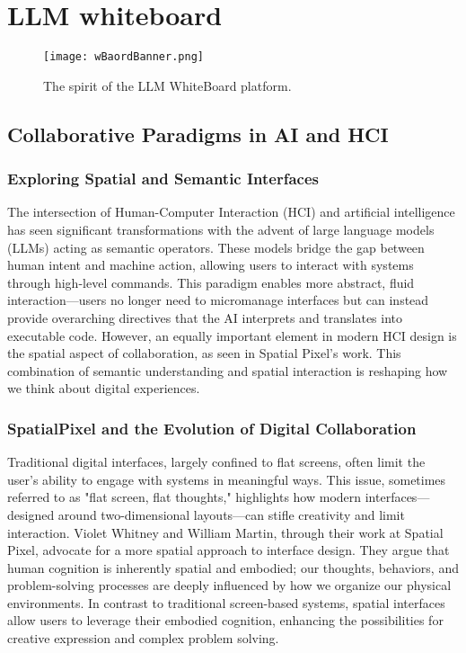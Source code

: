 \section{LLM whiteboard}



\begin{figure}[h]
    \centering
    \texttt{[image: wBaordBanner.png]}
    \caption{The spirit of the LLM WhiteBoard platform.}
    \vspace{0.1cm}
    \label{fig:spiritofWB}
\end{figure}

\subsection{Collaborative Paradigms in AI and HCI}

\subsubsection{Exploring Spatial and Semantic Interfaces}
The intersection of Human-Computer Interaction (HCI) and artificial intelligence has seen significant transformations with the advent of large language models (LLMs) acting as semantic operators.
These models bridge the gap between human intent and machine action, allowing users to interact with systems through high-level commands.
This paradigm enables more abstract, fluid interaction—users no longer need to micromanage interfaces but can instead provide overarching directives that the AI interprets and translates into executable code.
However, an equally important element in modern HCI design is the spatial aspect of collaboration, as seen in Spatial Pixel's work.
This combination of semantic understanding and spatial interaction is reshaping how we think about digital experiences.

\subsubsection{SpatialPixel and the Evolution of Digital Collaboration}
Traditional digital interfaces, largely confined to flat screens, often limit the user’s ability to engage with systems in meaningful ways.
This issue, sometimes referred to as "flat screen, flat thoughts,"\cite{whitney2024} highlights how modern interfaces—designed around two-dimensional layouts—can stifle creativity and limit interaction.
Violet Whitney and William Martin, through their work at Spatial Pixel, advocate for a more spatial approach to interface design.
They argue that human cognition is inherently spatial and embodied; our thoughts, behaviors, and problem-solving processes are deeply influenced by how we organize our physical environments.
In contrast to traditional screen-based systems, spatial interfaces allow users to leverage their embodied cognition, enhancing the possibilities for creative expression and complex problem solving.

